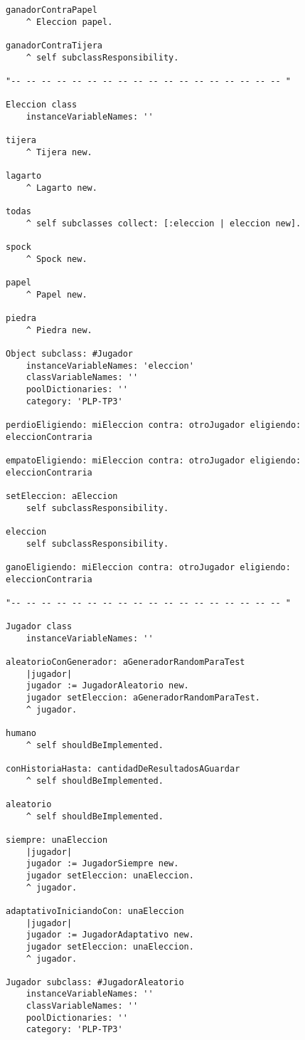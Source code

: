 \documentclass[10pt, a4paper,english,spanish,hidelinks]{article}
\begin{document}
\begin{verbatim}
ganadorContraPapel
	^ Eleccion papel. 

ganadorContraTijera
	^ self subclassResponsibility. 

"-- -- -- -- -- -- -- -- -- -- -- -- -- -- -- -- -- -- "

Eleccion class
	instanceVariableNames: ''

tijera
	^ Tijera new. 

lagarto
	^ Lagarto new. 

todas
	^ self subclasses collect: [:eleccion | eleccion new]. 

spock
	^ Spock new. 

papel
	^ Papel new. 

piedra
	^ Piedra new. 

Object subclass: #Jugador
	instanceVariableNames: 'eleccion'
	classVariableNames: ''
	poolDictionaries: ''
	category: 'PLP-TP3'

perdioEligiendo: miEleccion contra: otroJugador eligiendo: eleccionContraria 

empatoEligiendo: miEleccion contra: otroJugador eligiendo: eleccionContraria 

setEleccion: aEleccion 
	self subclassResponsibility. 

eleccion
	self subclassResponsibility. 

ganoEligiendo: miEleccion contra: otroJugador eligiendo: eleccionContraria 
	
"-- -- -- -- -- -- -- -- -- -- -- -- -- -- -- -- -- -- "

Jugador class
	instanceVariableNames: ''

aleatorioConGenerador: aGeneradorRandomParaTest
	|jugador|
	jugador := JugadorAleatorio new.
	jugador setEleccion: aGeneradorRandomParaTest.
	^ jugador. 

humano
	^ self shouldBeImplemented. 

conHistoriaHasta: cantidadDeResultadosAGuardar
	^ self shouldBeImplemented. 

aleatorio
	^ self shouldBeImplemented. 

siempre: unaEleccion
	|jugador|
	jugador := JugadorSiempre new.
	jugador setEleccion: unaEleccion.
	^ jugador. 

adaptativoIniciandoCon: unaEleccion
	|jugador|
	jugador := JugadorAdaptativo new.
	jugador setEleccion: unaEleccion.
	^ jugador. 

Jugador subclass: #JugadorAleatorio
	instanceVariableNames: ''
	classVariableNames: ''
	poolDictionaries: ''
	category: 'PLP-TP3'


\end{verbatim}
\end{document}
